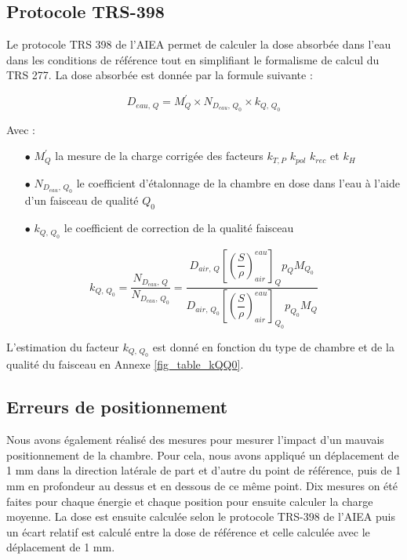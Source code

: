 \documentclass{article}
\begin{document}
\subsection{Protocole TRS-398}

Le protocole TRS 398 de l'AIEA \cite{international2001iaea} permet de calculer la dose absorbée dans l'eau dans les conditions de référence tout en simplifiant le formalisme de calcul du TRS 277. La dose absorbée est donnée par la formule suivante :

\begin{equation}
  D_{eau,\, Q} = M_{Q}^{'} \times N_{D_{eau},\, Q_0} \times k_{Q,\, Q_0}
  \label{eq_dose_398}
\end{equation}

Avec :
\begin{itemize}
  \item[$\bullet$] $M_{Q}^{'}$ la mesure de la charge corrigée des facteurs $k_{T,P}$ $k_{pol}$ $k_{rec}$ et $k_H$
  \item[$\bullet$] $N_{D_{eau},\, Q_0}$ le coefficient d'étalonnage de la chambre en dose dans l'eau à l'aide d'un faisceau de qualité $Q_0$ 
  \item[$\bullet$] $k_{Q,\, Q_0}$ le coefficient de correction de la qualité faisceau
\end{itemize}

\begin{equation}
  k_{Q,\, Q_0} = \dfrac{N_{D_{eau},\, Q}}{N_{D_{eau},\, Q_0}} = \dfrac{D_{air,\, Q} \left[\left(\dfrac{S}{\rho}\right) ^{eau}_{air}\right]_Q p_Q M_{Q_0}}{D_{air,\, Q_0 } \left[\left(\dfrac{S}{\rho}\right) ^{eau}_{air}\right]_{Q_0} p_{Q_0} M_Q}
\end{equation}

L'estimation du facteur $k_{Q,\, Q_0}$ est donné en fonction du type de chambre et de la qualité du faisceau en Annexe \ref*{fig_table_kQQ0}.

\subsection{Erreurs de positionnement}

Nous avons également réalisé des mesures pour mesurer l'impact d'un mauvais positionnement de la chambre. Pour cela, nous avons appliqué un déplacement de 1 mm dans la direction latérale de part et d'autre du point de référence, puis de 1 mm en profondeur au dessus et en dessous de ce même point. Dix mesures on été faites pour chaque énergie et chaque position pour ensuite calculer la charge moyenne. La dose est ensuite calculée selon le protocole TRS-398 de l'AIEA \cite{international2001iaea} puis un écart relatif est calculé entre la dose de référence et celle calculée avec le déplacement de 1 mm.
\end{document}
